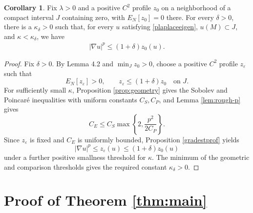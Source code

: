 \documentclass[11pt]{amsart}
\def \eps {\varepsilon}
\theoremstyle{definition}
\newtheorem{theorem}{Theorem}[section]
\newtheorem{corollary}{Corollary}[section]
\begin{document}
\begin{corollary}
    Fix $\lambda >0$ and a positive $C^2$ profile $z_0$ on a neighborhood of a compact interval $J$ containing zero, with $E_N[z_0]=0$ there.  For every $\delta>0$, there is a $\kappa_\delta>0$ such that, for every $u$ satisfying \eqref{plaplaceeigen}, $u(M)\subset J$, and $\kappa <\kappa_\delta$, we have
    \begin{align*}
        |\nabla u|^p\leq(1+\delta)z_0(u).
    \end{align*}
    \end{corollary}
\begin{proof} Fix \(\delta>0\). By Lemma 4.2 and \(\min_J z_0>0\), choose a positive \(C^2\) profile \(z_\varepsilon\) such that
\[
E_N[z_\varepsilon]>0,
\qquad
z_\varepsilon\leq(1+\delta)z_0
\quad\text{on }J.
\]
For sufficiently small \(\kappa\), Proposition \ref{prop:geometry} gives the Sobolev and Poincaré inequalities with uniform constants \(C_S,C_P\), and Lemma \ref{lem:rough-p} gives
\[
C_E\leq C_S\max\left\{2,\frac{p^2}{2C_P}\right\}.
\]
Since \(z_\varepsilon\) is fixed and \(C_E\) is uniformly bounded, Proposition \ref{gradestprof} yields
\[
|\nabla u|^p\leq z_\varepsilon(u)
\leq(1+\delta)z_0(u)
\]
under a further positive smallness threshold for \(\kappa\). The minimum of the geometric and comparison thresholds gives the required constant \(\kappa_\delta>0\).
\end{proof}


\section{Proof of Theorem \ref{thm:main}}
\end{document}
